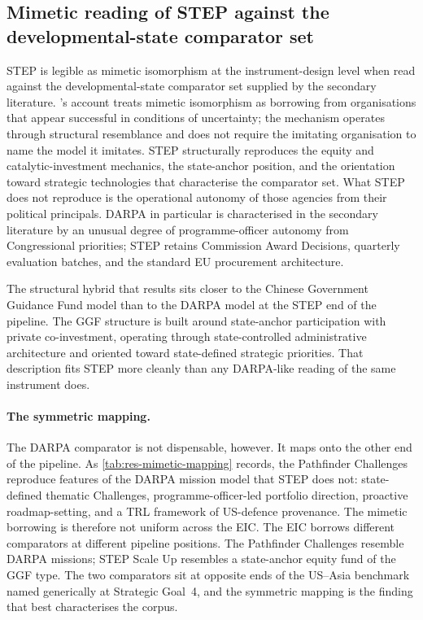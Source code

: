 \subsection{Mimetic reading of STEP against the developmental-state
comparator set}
\label{sec:disc-step-mimesis}

STEP is legible as mimetic isomorphism at the instrument-design level
when read against the developmental-state comparator set supplied by
the secondary literature. \textcite{dimaggio1983iron}'s account treats
mimetic isomorphism as borrowing from organisations that appear
successful in conditions of uncertainty; the mechanism operates
through structural resemblance and does not require the imitating
organisation to name the model it imitates. STEP structurally
reproduces the equity and catalytic-investment mechanics, the
state-anchor position, and the orientation toward strategic
technologies that characterise the comparator set. What STEP does not
reproduce is the operational autonomy of those agencies from their
political principals. DARPA in particular is characterised in the
secondary literature by an unusual degree of programme-officer
autonomy from Congressional priorities; STEP retains Commission Award
Decisions, quarterly evaluation batches, and the standard EU
procurement architecture.

The structural hybrid that results sits closer to the Chinese
Government Guidance Fund model than to the DARPA model at the STEP
end of the pipeline. The GGF structure is built around state-anchor
participation with private co-investment, operating through
state-controlled administrative architecture and oriented toward
state-defined strategic priorities. That description fits STEP more
cleanly than any DARPA-like reading of the same instrument does.

\paragraph{The symmetric mapping.}
The DARPA comparator is not dispensable, however. It maps onto the
other end of the pipeline. As \cref{tab:res-mimetic-mapping} records,
the Pathfinder Challenges reproduce features of the DARPA mission
model that STEP does not: state-defined thematic Challenges,
programme-officer-led portfolio direction, proactive roadmap-setting,
and a TRL framework of US-defence provenance. The mimetic borrowing is
therefore not uniform across the EIC. The EIC borrows different
comparators at different pipeline positions. The Pathfinder Challenges
resemble DARPA missions; STEP Scale Up resembles a state-anchor equity
fund of the GGF type. The two comparators sit at opposite ends of the
US--Asia benchmark named generically at Strategic Goal~4, and the
symmetric mapping is the finding that best characterises the corpus.

